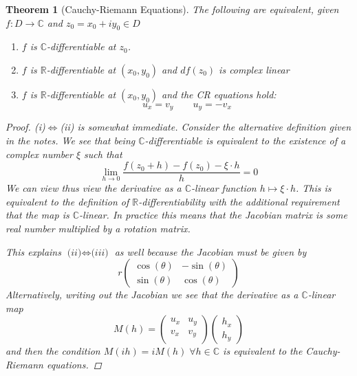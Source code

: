 \documentclass[11pt]{article}
\newcommand{\R}{\mathbb{R}}
\newcommand{\C}{\mathbb{C}}
\newtheorem{theorem}{Theorem}[section]
\begin{document}
\begin{theorem}[Cauchy-Riemann Equations]
The following are equivalent, given $f:D\to\C$ and $z_0=x_0 + i y_0\in D$
\begin{enumerate}[label=(\alph*)]
	\item $f$ is $\C$-differentiable at $z_0$.
	\item $f$ is $\R$-differentiable at $(x_0,y_0)$ and $df(z_0)$ is complex linear
	\item $f$ is $\R$-differentiable at $(x_0,y_0)$ and the CR equations hold:
		\[
			u_x=v_y \quad\quad u_y = -v_x
		\]
\end{enumerate}

\begin{proof}
\textit{(i)}$\iff$\textit{(ii)} is somewhat immediate.
Consider the alternative definition given in the notes.
We see that being $\C$-differentiable is equivalent to the existence of a complex number $\xi$ such that
\[
	\lim_{h\to 0}\frac{f(z_0+h)-f(z_0)-\xi\cdot h}{h}=0
\]
We can view thus view the derivative as a $\C$-linear function $h\mapsto \xi\cdot h$.
This is equivalent to the definition of $\R$-differentiability with the additional requirement that the map is $\C$-linear.
In practice this means that the Jacobian matrix is some real number multiplied by a rotation matrix.

This explains $\textit{(ii)}\iff\textit{(iii)}$ as well because the Jacobian must be given by
\[
	r
	\begin{pmatrix}
		\cos(\theta) & -\sin(\theta)	\\
		\sin(\theta) & \cos(\theta)
	\end{pmatrix}
\]
Alternatively, writing out the Jacobian we see that the derivative as a $\C$-linear map
\[
	M(h)=
\begin{pmatrix}
	u_x & u_y \\
	v_x & v_y \\
\end{pmatrix}
	\begin{pmatrix}
	h_x \\
	h_y
	\end{pmatrix}
\]
and then the condition $M(ih)=iM(h)\; \forall h\in \C$ is equivalent to the Cauchy-Riemann equations.
\end{proof}
\end{theorem}
\end{document}
